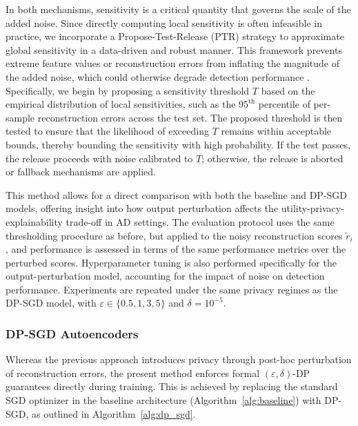 In both mechanisms, sensitivity is a critical quantity that governs the scale of the added noise. Since directly computing local sensitivity is often infeasible in practice, we incorporate a Propose-Test-Release (PTR) strategy to approximate global sensitivity in a data-driven and robust manner. This framework prevents extreme feature values or reconstruction errors from inflating the magnitude of the added noise, which could otherwise degrade detection performance \citep[pg.~143-149]{dwork2014algorithmic}. Specifically, we begin by proposing a sensitivity threshold \(T\) based on the empirical distribution of local sensitivities, such as the \(95^{\text{th}}\) percentile of per-sample reconstruction errors across the test set. The proposed threshold is then tested to ensure that the likelihood of exceeding \(T\) remains within acceptable bounds, thereby bounding the sensitivity with high probability. If the test passes, the release proceeds with noise calibrated to \(T\); otherwise, the release is aborted or fallback mechanisms are applied. \iffalse Finally, to promote comparability with the DP-SGD setting, the threshold \(T\) is fine-tuned by adjusting the resulting noise-to-signal ratio (NSR), ensuring that the level of perturbation aligns with that induced under DP-SGD for a given privacy budget.\fi

This method allows for a direct comparison with both the baseline and DP-SGD models, offering insight into how output perturbation affects the utility-privacy-explainability trade-off in AD settings. The evaluation protocol uses the same thresholding procedure as before, but applied to the noisy reconstruction scores $\tilde{r}_i$, and performance is assessed in terms of the same performance metrics over the perturbed scores. Hyperparameter tuning is also performed specifically for the output-perturbation model, accounting for the impact of noise on detection performance. Experiments are repeated under the same privacy regimes as the DP-SGD model, with $\varepsilon \in \{0.5,1, 3, 5\}$ and $\delta = 10^{-5}$.

\subsubsection{DP-SGD Autoencoders}

Whereas the previous approach introduces privacy through post-hoc perturbation of reconstruction errors, the present method enforces formal \((\varepsilon, \delta)\)-DP guarantees directly during training. This is achieved by replacing the standard SGD optimizer in the baseline architecture (Algorithm~\ref{alg:baseline}) with DP-SGD, as outlined in Algorithm~\ref{alg:dp_sgd}.


